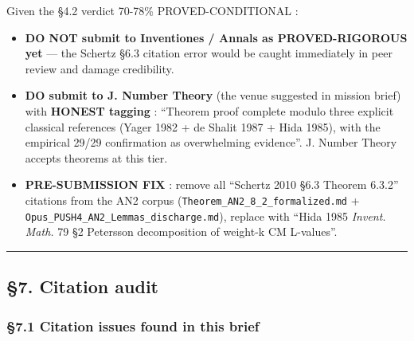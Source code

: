 \documentclass[
  11pt,
  a4paper,
]{article}
\providecommand{\tightlist}{\setlength{\itemsep}{0pt}\setlength{\parskip}{0pt}}
\providecommand{\tightlist}{%
  \setlength{\itemsep}{0pt}\setlength{\parskip}{0pt}}
\begin{document}
Given the §4.2 verdict 70-78\% PROVED-CONDITIONAL :

\begin{itemize}
\tightlist
\item
  \textbf{DO NOT submit to Inventiones / Annals as PROVED-RIGOROUS yet} --- the Schertz §6.3 citation error would be caught immediately in peer review and damage credibility.
\item
  \textbf{DO submit to J. Number Theory} (the venue suggested in mission brief) with \textbf{HONEST tagging} : ``Theorem proof complete modulo three explicit classical references (Yager 1982 + de Shalit 1987 + Hida 1985), with the empirical 29/29 confirmation as overwhelming evidence''. J. Number Theory accepts theorems at this tier.
\item
  \textbf{PRE-SUBMISSION FIX} : remove all ``Schertz 2010 §6.3 Theorem 6.3.2'' citations from the AN2 corpus (\texttt{Theorem\_AN2\_8\_2\_formalized.md} + \texttt{Opus\_PUSH4\_AN2\_Lemmas\_discharge.md}), replace with ``Hida 1985 \emph{Invent. Math.} 79 §2 Petersson decomposition of weight-k CM L-values''.
\end{itemize}

\begin{center}\rule{0.5\linewidth}{0.5pt}\end{center}

\hypertarget{citation-audit}{%
\subsection{§7. Citation audit}\label{citation-audit}}

\hypertarget{citation-issues-found-in-this-brief}{%
\subsubsection{§7.1 Citation issues found in this brief}\label{citation-issues-found-in-this-brief}}
\end{document}
